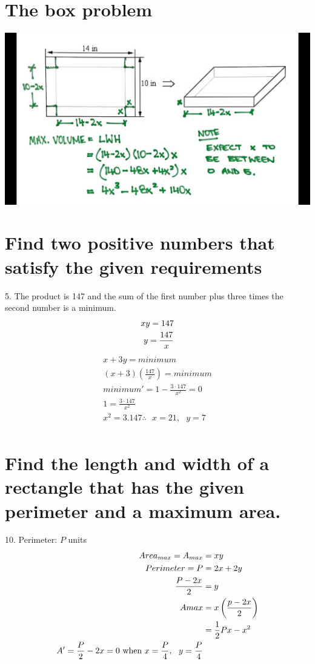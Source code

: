 \documentclass[11pt]{article}
\newcommand*{\set}{\setcounter{equation}{0}}
\begin{document}
\section{The box problem}
\includegraphics[scale=0.25]{maxresdefault.jpg}
\section{Find two positive numbers that satisfy the given requirements}
5. The product is 147 and the sum of the first number plus three times the second number is a minimum.
\begin{align}
    \set
    xy=147\\
    y=\frac{147}{x}
\end{align}
\begin{align}
    x+3y= minimum\\
    (x+3)(\frac{147}{x})= minimum\\
    minimum'=1-\frac{3\cdot 147}{x^2}=0\\
    1=\frac{3\cdot 147}{x^2}\\
    x^2=3.147\therefore\,\,\,\, x=21,\,\,\,\, y=7\\
\end{align}

\section{Find the length and width of a rectangle that has the given perimeter and a maximum area.}
10. Perimeter: $P$ units
\begin{align}
    \set
    Area_{max}=A_{max}&=xy\\
    Perimeter=P&=2x+2y\\
    \frac{P-2x}{2}&=y\\
    A{max}&=x\left(\frac{p-2x}{2}\right)\\
    &=\frac{1}{2}Px-x^2\\
    A'=\frac{P}{2}-2x=0\,\,\text{when}\,\, x=\frac{P}{4},\,\,\,\, y=\frac{P}{4}
\end{align}
\end{document}
